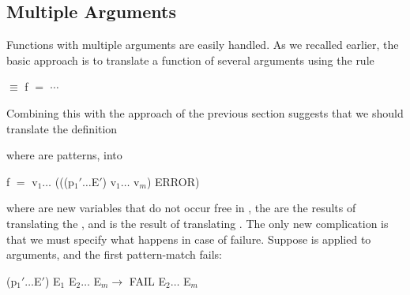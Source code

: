 \subsection{Multiple Arguments}

Functions with multiple arguments are easily handled. As we recalled earlier, the basic approach is to translate a function of several arguments using the rule
\begin{mlcoded}
     $\equiv$ f $=$ $\cdots$
\end{mlcoded}
Combining this with the approach of the previous section suggests that we should translate the definition
\begin{mlcoded}
\end{mlcoded}
where  are patterns, into
\begin{mlcoded}
    f $=$ \tl{}v$_1\ldots$ (((\tl{}p$_{1}'\ldots$E$'$) v$_1 \ldots$ v$_m$) \fatbar{} ERROR)
\end{mlcoded}
where  are new variables that do not occur free in , the  are the results of translating the , and  is the result of translating . The only new complication is that we must specify what happens in case of failure. Suppose  is applied to  arguments, and the first pattern-match fails:
\begin{mlcoded}
    (\tl{}p$_{1}' \ldots$E$'$) E$_1$ E$_2 \ldots$ E$_m \rightarrow$ FAIL E$_2 \ldots$ E$_m$
\end{mlcoded}

